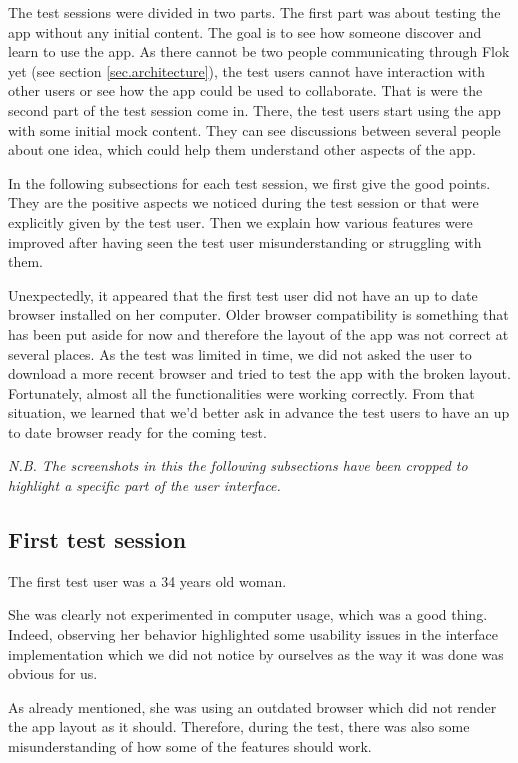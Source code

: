 \documentclass[a4paper,12pt,twoside]{article}
\begin{document}
The test sessions were divided in two parts.
The first part was about testing the app without any initial content.
The goal is to see how someone discover and learn to use the app.
As there cannot be two people communicating through Flok yet (see section \ref{sec.architecture}), the test users cannot have interaction with other users or see how the app could be used to collaborate.
That is were the second part of the test session come in.
There, the test users start using the app with some initial mock content.
They can see discussions between several people about one idea, which could help them understand other aspects of the app.

In the following subsections for each test session, we first give the good points.
They are the positive aspects we noticed during the test session or that were explicitly given by the test user.
Then we explain how various features were improved after having seen the test user misunderstanding or struggling with them.

Unexpectedly, it appeared that the first test user did not have an up to date browser installed on her computer.
Older browser compatibility is something that has been put aside for now and therefore the layout of the app was not correct at several places.
As the test was limited in time, we did not asked the user to download a more recent browser and tried to test the app with the broken layout.
Fortunately, almost all the functionalities were working correctly.
From that situation, we learned that we'd better ask in advance the test users to have an up to date browser ready for the coming test.

\emph{N.B. The screenshots in this the following subsections have been cropped to highlight a specific part of the user interface.}

\subsection{First test session}
The first test user was a 34 years old woman.

She was clearly not experimented in computer usage, which was a good thing.
Indeed, observing her behavior highlighted some usability issues in the interface implementation which we did not notice by ourselves as the way it was done was obvious for us.

As already mentioned, she was using an outdated browser which did not render the app layout as it should.
Therefore, during the test, there was also some misunderstanding of how some of the features should work.
\end{document}

